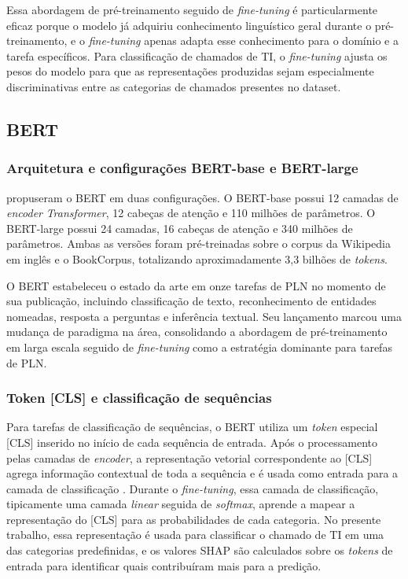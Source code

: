 \documentclass[
    12pt,                %
    openright,           %
    oneside,             %
    a4paper,             %
    english,             %
    brazil               %
]{abntex2}
\begin{document}
Essa abordagem de pré-treinamento seguido de \textit{fine-tuning} é particularmente eficaz porque o modelo já adquiriu conhecimento linguístico geral durante o pré-treinamento, e o \textit{fine-tuning} apenas adapta esse conhecimento para o domínio e a tarefa específicos. Para classificação de chamados de TI, o \textit{fine-tuning} ajusta os pesos do modelo para que as representações produzidas sejam especialmente discriminativas entre as categorias de chamados presentes no dataset.

\subsection{BERT}
\label{subsec:bert_modelo}

\subsubsection{Arquitetura e configurações BERT-base e BERT-large}
\label{subsubsec:bert_arquitetura}

 propuseram o BERT em duas configurações. O BERT-base possui 12 camadas de \textit{encoder} \textit{Transformer}, 12 cabeças de atenção e 110 milhões de parâmetros. O BERT-large possui 24 camadas, 16 cabeças de atenção e 340 milhões de parâmetros. Ambas as versões foram pré-treinadas sobre o corpus da Wikipedia em inglês e o BookCorpus, totalizando aproximadamente 3,3 bilhões de \textit{tokens}.

O BERT estabeleceu o estado da arte em onze tarefas de PLN no momento de sua publicação, incluindo classificação de texto, reconhecimento de entidades nomeadas, resposta a perguntas e inferência textual. Seu lançamento marcou uma mudança de paradigma na área, consolidando a abordagem de pré-treinamento em larga escala seguido de \textit{fine-tuning} como a estratégia dominante para tarefas de PLN.

\subsubsection{Token [CLS] e classificação de sequências}
\label{subsubsec:bert_cls}

Para tarefas de classificação de sequências, o BERT utiliza um \textit{token} especial [CLS] inserido no início de cada sequência de entrada. Após o processamento pelas camadas de \textit{encoder}, a representação vetorial correspondente ao [CLS] agrega informação contextual de toda a sequência e é usada como entrada para a camada de classificação \cite{devlin2019}. Durante o \textit{fine-tuning}, essa camada de classificação, tipicamente uma camada \textit{linear} seguida de \textit{softmax}, aprende a mapear a representação do [CLS] para as probabilidades de cada categoria. No presente trabalho, essa representação é usada para classificar o chamado de TI em uma das categorias predefinidas, e os valores SHAP são calculados sobre os \textit{tokens} de entrada para identificar quais contribuíram mais para a predição.
\end{document}
